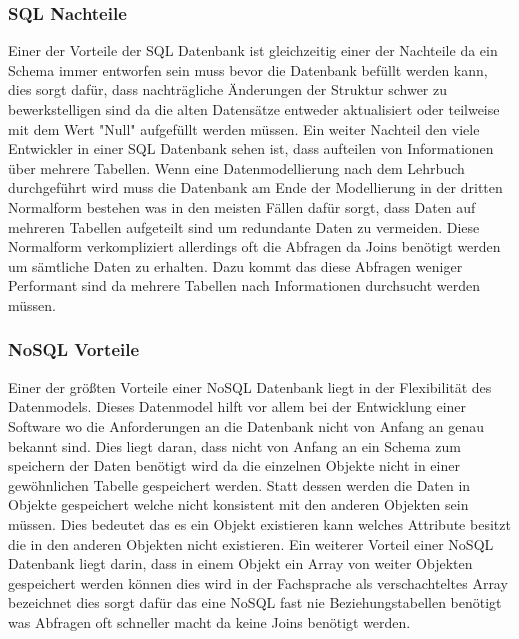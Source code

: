 	\subsubsection{SQL Nachteile}
		Einer der Vorteile der SQL Datenbank ist gleichzeitig einer der Nachteile da ein Schema immer entworfen sein muss bevor die Datenbank befüllt werden kann, dies sorgt dafür, dass nachträgliche Änderungen der Struktur schwer zu bewerkstelligen sind da die alten Datensätze entweder aktualisiert oder teilweise mit dem Wert "Null" aufgefüllt werden müssen. Ein weiter Nachteil den viele Entwickler in einer SQL Datenbank sehen ist, dass aufteilen von Informationen über mehrere Tabellen. Wenn eine Datenmodellierung nach dem Lehrbuch durchgeführt wird muss die Datenbank am Ende der Modellierung in der dritten Normalform bestehen was in den meisten Fällen dafür sorgt, dass Daten auf mehreren Tabellen aufgeteilt sind um redundante Daten zu vermeiden. Diese Normalform verkompliziert allerdings oft die Abfragen da Joins benötigt werden um sämtliche Daten zu erhalten. Dazu kommt das diese Abfragen weniger Performant sind da mehrere Tabellen nach Informationen durchsucht werden müssen. 
		
	\subsubsection{NoSQL Vorteile}
		Einer der größten Vorteile einer NoSQL Datenbank liegt in der Flexibilität des Datenmodels. Dieses Datenmodel hilft vor allem bei der Entwicklung einer Software wo die Anforderungen an die Datenbank nicht von Anfang an genau bekannt sind. Dies liegt daran, dass nicht von Anfang an ein Schema zum speichern der Daten benötigt wird da die einzelnen Objekte nicht in einer gewöhnlichen Tabelle gespeichert werden. Statt dessen werden die Daten in Objekte gespeichert welche nicht konsistent mit den anderen Objekten sein müssen. Dies bedeutet das es ein Objekt existieren kann welches Attribute besitzt die in den anderen Objekten nicht existieren. Ein weiterer Vorteil einer NoSQL Datenbank liegt darin, dass in einem Objekt ein Array von weiter Objekten gespeichert werden können dies wird in der Fachsprache als verschachteltes Array bezeichnet dies sorgt dafür das eine NoSQL fast nie Beziehungstabellen benötigt was Abfragen oft schneller macht da keine Joins benötigt werden. 
	
